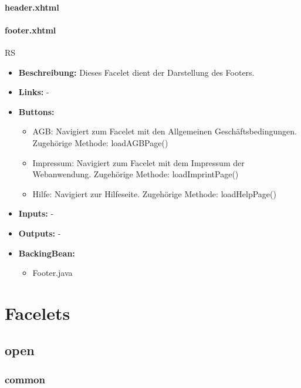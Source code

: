 		\paragraph{header.xhtml}
		
		\paragraph{footer.xhtml}
			RS\\
			\begin{itemize}
				\item \textbf{Beschreibung:} Dieses Facelet dient der Darstellung des Footers.
				\item \textbf{Links:} -
				\item \textbf{Buttons:}
					\begin{itemize}
						\item AGB: Navigiert zum Facelet mit den Allgemeinen Geschäftsbedingungen. Zugehörige Methode: loadAGBPage()
						\item Impressum: Navigiert zum Facelet mit dem Impressum der Webanwendung. Zugehörige Methode: loadImprintPage()
						\item Hilfe: Navigiert zur Hilfeseite. Zugehörige Methode: loadHelpPage()
					\end{itemize}
				\item \textbf{Inputs:} -
				\item \textbf{Outputs:} -
				\item \textbf{BackingBean:}
					\begin{itemize}
						\item Footer.java
					\end{itemize}
			\end{itemize}
	
	\section{Facelets}
	
		\subsection{open}
			
			\subsubsection{common}
			
